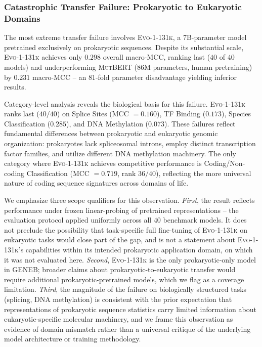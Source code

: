 \documentclass{llmxive}
\begin{document}
\subsubsection{Catastrophic Transfer Failure: Prokaryotic to Eukaryotic Domains}

The most extreme transfer failure involves \textsc{Evo-1-131k}, a
7B-parameter model pretrained exclusively on prokaryotic
sequences. Despite its substantial scale, \textsc{Evo-1-131k}
achieves only $0.298$ overall macro-MCC, ranking last ($40$ of
$40$ models) and underperforming \textsc{MutBERT} (86M parameters,
human pretraining) by $0.231$ macro-MCC -- an $81$-fold parameter
disadvantage yielding inferior results.

Category-level analysis reveals the biological basis for this
failure. \textsc{Evo-1-131k} ranks last ($40/40$) on Splice Sites
(MCC $= 0.160$), TF Binding ($0.173$), Species Classification
($0.285$), and DNA Methylation ($0.073$). These failures reflect
fundamental differences between prokaryotic and eukaryotic genomic
organization: prokaryotes lack spliceosomal introns, employ
distinct transcription factor families, and utilize different DNA
methylation machinery. The only category where \textsc{Evo-1-131k}
achieves competitive performance is Coding/Non-coding Classification
(MCC $= 0.719$, rank $36/40$), reflecting the more universal
nature of coding sequence signatures across domains of life.

We emphasize three scope qualifiers for this observation.
\emph{First}, the result reflects performance under frozen
linear-probing of pretrained representations -- the evaluation
protocol applied uniformly across all $40$ benchmark models. It does not preclude
the possibility that task-specific full fine-tuning of
\textsc{Evo-1-131k} on eukaryotic tasks would close part of the
gap, and is not a statement about \textsc{Evo-1-131k}'s
capabilities within its intended prokaryotic application domain,
on which it was not evaluated here. \emph{Second},
\textsc{Evo-1-131k} is the only prokaryotic-only model in GENEB;
broader claims about prokaryotic-to-eukaryotic transfer would
require additional prokaryotic-pretrained models, which we flag as
a coverage limitation. \emph{Third}, the magnitude of the failure
on biologically structured tasks (splicing, DNA methylation) is
consistent with the prior expectation that representations of
prokaryotic sequence statistics carry limited information about
eukaryotic-specific molecular machinery, and we frame this
observation as evidence of domain mismatch rather than a universal
critique of the underlying model architecture or training
methodology.
\end{document}
